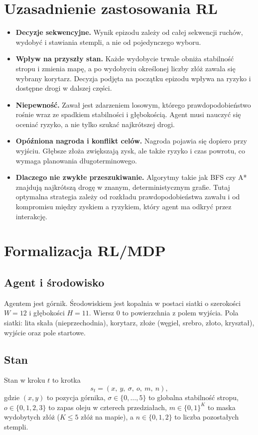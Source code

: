 \documentclass[11pt,a4paper]{article}
\begin{document}
\section{Uzasadnienie zastosowania RL}
\begin{itemize}
  \item \textbf{Decyzje sekwencyjne.} Wynik epizodu zależy od całej sekwencji
  ruchów, wydobyć i stawiania stempli, a nie od pojedynczego wyboru.
  \item \textbf{Wpływ na przyszły stan.} Każde wydobycie trwale obniża stabilność
  stropu i zmienia mapę, a po wydobyciu określonej liczby złóż zawala się wybrany
  korytarz. Decyzja podjęta na początku epizodu wpływa na ryzyko i dostępne drogi
  w dalszej części.
  \item \textbf{Niepewność.} Zawał jest zdarzeniem losowym, którego
  prawdopodobieństwo rośnie wraz ze spadkiem stabilności i głębokością.
  Agent musi nauczyć się oceniać ryzyko, a nie tylko szukać najkrótszej drogi.
  \item \textbf{Opóźniona nagroda i konflikt celów.} Nagroda pojawia się dopiero
  przy wyjściu. Głębsze złoża zwiększają zysk, ale także ryzyko i czas powrotu,
  co wymaga planowania długoterminowego.
  \item \textbf{Dlaczego nie zwykłe przeszukiwanie.} Algorytmy takie jak BFS czy
  A* znajdują najkrótszą drogę w znanym, deterministycznym grafie. Tutaj
  optymalna strategia zależy od rozkładu prawdopodobieństwa zawału i od
  kompromisu między zyskiem a ryzykiem, który agent ma odkryć przez interakcję.
\end{itemize}

\section{Formalizacja RL/MDP}
\subsection{Agent i środowisko}
Agentem jest górnik. Środowiskiem jest kopalnia w postaci siatki
o szerokości $W=12$ i głębokości $H=11$. Wiersz $0$ to
powierzchnia z polem wyjścia. Pola siatki: lita skała (nieprzechodnia),
korytarz, złoże (węgiel, srebro, złoto, kryształ), wyjście oraz pole startowe.

\subsection{Stan}
Stan w kroku $t$ to krotka
\[
  s_t = (x,\ y,\ \sigma,\ o,\ m,\ n),
\]
gdzie $(x,y)$ to pozycja górnika, $\sigma \in \{0,\dots,5\}$ to globalna
stabilność stropu, $o \in \{0,1,2,3\}$ to zapas oleju w czterech przedziałach,
$m \in \{0,1\}^K$ to maska wydobytych złóż ($K \le 5$ złóż na mapie),
a $n \in \{0,1,2\}$ to liczba pozostałych stempli.
\end{document}
